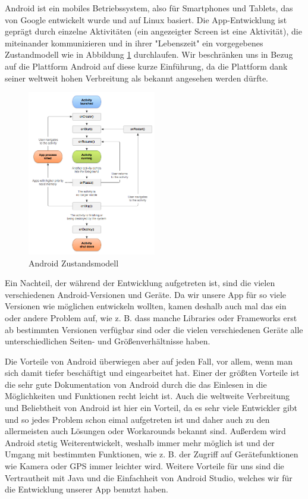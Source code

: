Android ist ein mobiles Betriebssystem, also für Smartphones und Tablets, das von Google entwickelt wurde und auf Linux basiert. Die App-Entwicklung ist geprägt durch einzelne Aktivitäten (ein angezeigter Screen ist eine Aktivität), die miteinander kommunizieren und in ihrer "Lebenszeit"{} ein vorgegebenes Zustandmodell wie in Abbildung \ref{figure:androidZustandsmodell} durchlaufen. Wir beschränken uns in Bezug auf die Plattform Android auf diese kurze Einführung, da die Plattform dank seiner weltweit hohen Verbreitung als bekannt angesehen werden dürfte.

\begin{figure}[htp]
	\centering
  	\includegraphics[width=0.5\textwidth]{img/modelle/AndroidZustandsmodell.png}
	\caption[Android Zustandsmodell]{Android Zustandsmodell\footnotemark}
	\label{figure:androidZustandsmodell}
\end{figure}

Ein Nachteil, der während der Entwicklung aufgetreten ist, sind die vielen verschiedenen Android-Versionen und Geräte. Da wir unsere App für so viele Versionen wie möglichen entwickeln wollten, kamen deshalb auch mal das ein oder andere Problem auf, wie z. B. dass manche Libraries oder Frameworks erst ab bestimmten Versionen verfügbar sind oder die vielen verschiedenen Geräte alle unterschiedlichen Seiten- und Größenverhältnisse haben.

Die Vorteile von Android überwiegen aber auf jeden Fall, vor allem, wenn man sich damit tiefer beschäftigt und eingearbeitet hat. Einer der größten Vorteile ist die sehr gute Dokumentation von Android durch die das Einlesen in die Möglichkeiten und Funktionen recht leicht ist. Auch die weltweite Verbreitung und Beliebtheit von Android ist hier ein Vorteil, da es sehr viele Entwickler gibt und so jedes Problem schon eimal aufgetreten ist und daher auch zu den allermeisten auch Lösungen oder Workarounds bekannt sind. Außerdem wird Android stetig Weiterentwickelt, weshalb immer mehr möglich ist und der Umgang mit bestimmten Funktionen, wie z. B. der Zugriff auf Gerätefunktionen wie Kamera oder GPS immer leichter wird. Weitere Vorteile für uns sind die Vertrautheit mit Java und die Einfachheit von Android Studio, welches wir für die Entwicklung unserer App benutzt haben.

